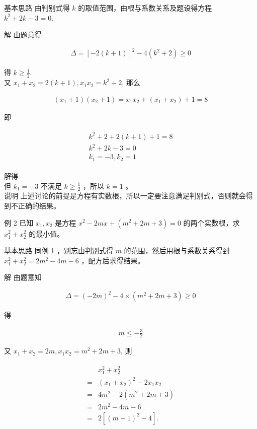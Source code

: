 \documentclass[10pt]{article}
\begin{document}
基本思路 由判别式得 $k$ 的取值范围，由根与系数关系及题设得方程 $k^{2}+2 k-3=0$.

解 由题意得

\begin{align*}
\Delta=[-2(k+1)]^{2}-4\left(k^{2}+2\right) \geqslant 0
\end{align*}

得 $k \geqslant \frac{1}{2}$.\\
又 $x_{1}+x_{2}=2(k+1), x_{1} x_{2}=k^{2}+2$, 那么

\begin{align*}
\left(x_{1}+1\right)\left(x_{2}+1\right)=x_{1} x_{2}+\left(x_{1}+x_{2}\right)+1=8
\end{align*}

即

\begin{align*}
\begin{gathered}
k^{2}+2+2(k+1)+1=8 \\
k^{2}+2 k-3=0 \\
k_{1}=-3, k_{2}=1
\end{gathered}
\end{align*}

解得\\
但 $k_{1}=-3$ 不满足 $k \geqslant \frac{1}{2}$ ，所以 $k=1$ 。\\
说明 上述讨论的前提是方程有实数根，所以一定要注意满足判别式，否则就会得到不正确的结果。

例 2 已知 $x_{1}, x_{2}$ 是方程 $x^{2}-2 m x+\left(m^{2}+2 m+3\right)=0$ 的两个实数根，求 $x_{1}^{2}+x_{2}^{2}$ 的最小值。

基本思路 同例 1 ，别忘由判别式得 $m$ 的范围，然后用根与系数关系得到 $x_{1}^{2}+x_{2}^{2}=2 m^{2}-4 m-6$ ，配方后求得结果。

解 由题意知

\begin{align*}
\Delta=(-2 m)^{2}-4 \times\left(m^{2}+2 m+3\right) \geqslant 0
\end{align*}

得

\begin{align*}
m \leqslant-\frac{3}{2}
\end{align*}

又 $x_{1}+x_{2}=2 m, x_{1} x_{2}=m^{2}+2 m+3$, 则

\begin{align*}
\begin{aligned}
& x_{1}^{2}+x_{2}^{2} \\
= & \left(x_{1}+x_{2}\right)^{2}-2 x_{1} x_{2} \\
= & 4 m^{2}-2\left(m^{2}+2 m+3\right) \\
= & 2 m^{2}-4 m-6 \\
= & 2\left[(m-1)^{2}-4\right] .
\end{aligned}
\end{align*}
\end{document}

